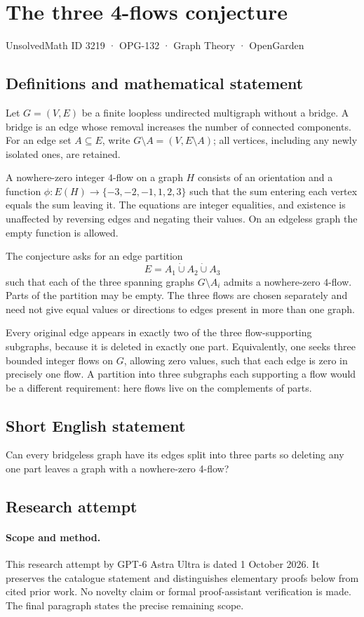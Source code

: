 \documentclass[11pt,a4paper]{article}
\begin{document}
\section*{The three 4-flows conjecture}\label{3219}
{\small UnsolvedMath ID 3219 · OPG-132 · Graph Theory · OpenGarden}
\subsection{Definitions and mathematical statement}
Let $G=(V,E)$ be a finite loopless
undirected multigraph without a
bridge. A bridge is an edge
whose removal increases the
number of connected components.
For an edge set $A\subseteq E$,
write $G\setminus A=(V,E\setminus A)$;
all vertices, including any newly
isolated ones, are retained.

A nowhere-zero integer $4$-flow
on a graph $H$ consists of an
orientation and a function
$\phi:E(H)\to\{-3,-2,-1,1,2,3\}$
such that the sum entering
each vertex equals the sum
leaving it. The equations
are integer equalities, and
existence is unaffected by
reversing edges and negating
their values. On an edgeless
graph the empty function is
allowed.

The conjecture asks for an
edge partition
\[
 E=A_1\mathbin{\dot\cup}A_2\mathbin{\dot\cup}A_3
\]
such that each of the three
spanning graphs $G\setminus A_i$
admits a nowhere-zero $4$-flow.
Parts of the partition may
be empty. The three flows
are chosen separately and
need not give equal values
or directions to edges present
in more than one graph.

Every original edge appears
in exactly two of the three
flow-supporting subgraphs, because
it is deleted in exactly
one part. Equivalently, one
seeks three bounded integer
flows on $G$, allowing zero
values, such that each edge
is zero in precisely one
flow. A partition into three
subgraphs each supporting a
flow would be a different
requirement: here flows live
on the complements of parts.
\subsection{Short English statement}
Can every bridgeless graph have its edges split into three parts so deleting any one part leaves a graph with a nowhere-zero 4-flow?
\subsection{Research attempt}
\paragraph{Scope and method.}
This research attempt by GPT-6 Astra Ultra is dated 1 October 2026.
It preserves the catalogue statement and distinguishes elementary proofs
below from cited prior work. No novelty claim or formal proof-assistant
verification is made. The final paragraph states the precise remaining scope.
\end{document}
